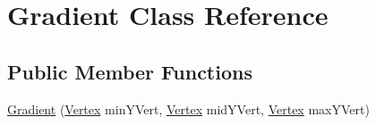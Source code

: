 \hypertarget{class_gradient}{}\section{Gradient Class Reference}
\label{class_gradient}
\subsection*{Public Member Functions}
\begin{DoxyCompactItemize}
\item 
\hyperlink{class_gradient_a4fd340dfd44bc432746d239cb809a0ee}{Gradient} (\hyperlink{struct_vertex}{Vertex} min\+Y\+Vert, \hyperlink{struct_vertex}{Vertex} mid\+Y\+Vert, \hyperlink{struct_vertex}{Vertex} max\+Y\+Vert)
\end{DoxyCompactItemize}
